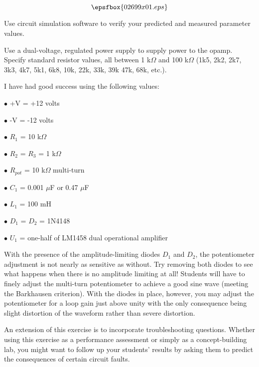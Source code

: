 

$$\epsfbox{02699x01.eps}$$

\vfil \eject






Use circuit simulation software to verify your predicted and measured parameter values.







Use a dual-voltage, regulated power supply to supply power to the opamp.  Specify standard resistor values, all between 1 k$\Omega$ and 100 k$\Omega$ (1k5, 2k2, 2k7, 3k3, 4k7, 5k1, 6k8, 10k, 22k, 33k, 39k 47k, 68k, etc.).

I have had good success using the following values:

\medskip
\item{$\bullet$} +V = +12 volts
\item{$\bullet$} -V = -12 volts
\item{$\bullet$} $R_1$ = 10 k$\Omega$
\item{$\bullet$} $R_2$ = $R_3$ = 1 k$\Omega$
\item{$\bullet$} $R_{pot}$ = 10 k$\Omega$ multi-turn
\item{$\bullet$} $C_1$ = 0.001 $\mu$F or 0.47 $\mu$F
\item{$\bullet$} $L_1$ = 100 mH
\item{$\bullet$} $D_1$ = $D_2$ = 1N4148
\item{$\bullet$} $U_1$ = one-half of LM1458 dual operational amplifier
\medskip

With the presence of the amplitude-limiting diodes $D_1$ and $D_2$, the potentiometer adjustment is not nearly as sensitive as without.  Try removing both diodes to see what happens when there is no amplitude limiting at all!  Students will have to finely adjust the multi-turn potentiometer to achieve a good sine wave (meeting the Barkhausen criterion).  With the diodes in place, however, you may adjust the potentiometer for a loop gain just above unity with the only consequence being slight distortion of the waveform rather than severe distortion.

An extension of this exercise is to incorporate troubleshooting questions.  Whether using this exercise as a performance assessment or simply as a concept-building lab, you might want to follow up your students' results by asking them to predict the consequences of certain circuit faults.




